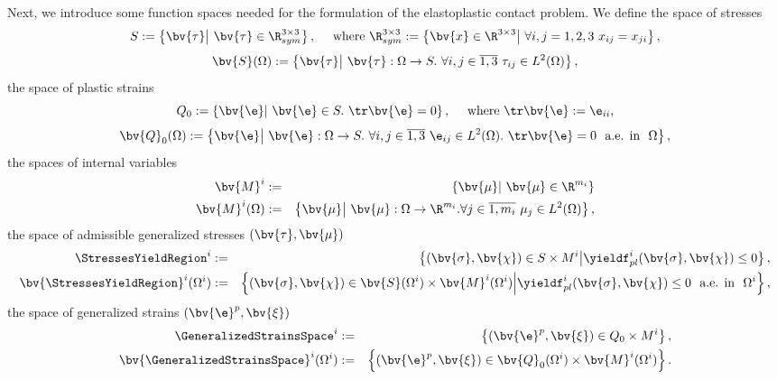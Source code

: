 Next, we introduce some function spaces needed for the formulation of the elastoplastic contact problem. We define the space of stresses
\begin{equation}
S:=\left\{\bv{\tau}\middle|~\bv{\tau}\in \R^{3\times 3}_{sym}\right\},\quad \mbox{ where } \R^{3\times 3}_{sym}:=\left\lbrace \bv{x}\in \R^{3\times 3}\middle|~ \forall i,j=1,2,3~x_{ij}=x_{ji}\right\rbrace,
\end{equation}
\begin{equation}
\bv{S}(\Omega):=\left\{\bv{\tau}\middle|~\bv{\tau}:\Omega\rightarrow S.~\forall i,j\in \overline{1,3}~ \tau_{ij}\in L^{2}(\Omega) \right\},
\end{equation}
the space of plastic strains
\begin{equation}
Q_0:=\left\{\bv{\e}\middle|~\bv{\e}\in S.~ \tr \bv{\e} = 0\right\},\quad \mbox{ where } \tr \bv{\e} :=\e_{ii},
\end{equation}
\begin{equation}
\bv{Q}_0(\Omega):=\left\{\bv{\e}\middle|~\bv{\e}:\Omega\rightarrow S.~\forall i,j\in \overline{1,3}~ \e_{ij}\in L^{2}(\Omega). ~ \tr \bv{\e} = 0~\text{ a.e. in }~\Omega \right\},
\end{equation}
the spaces of internal variables
\begin{eqnarray}
\bv{M}^{i}&:=&\left\{\bv{\mu}\middle|~\bv{\mu}\in \R^{m_i}\right\} \\
\bv{M}^{i}(\Omega)&:=&\left\{\bv{\mu}\middle|~\bv{\mu}:\Omega\rightarrow \R^{m_i}. \forall j \in \overline{1,m_i} ~ \mu_j\in L^{2}(\Omega) \right\},
\end{eqnarray}
the space of admissible generalized stresses $(\bv{\tau},\bv{\mu})$
\begin{eqnarray}
\StressesYieldRegion^{i}&:=&\left\lbrace (\bv{\sigma},\bv{\chi})\in S\times M^{i} \middle| \yieldf_{pl}^{i}(\bv{\sigma},\bv{\chi})\leq 0 \right\rbrace, \\
\bv{\StressesYieldRegion}^{i}(\Omega^{i})&:=&\left\lbrace (\bv{\sigma},\bv{\chi})\in \bv{S}(\Omega^i)\times \bv{M}^{i}(\Omega^i)\middle|\yieldf_{pl}^{i}(\bv{\sigma},\bv{\chi})\leq 0 ~\text{ a.e. in }~\Omega^i\right\rbrace,
\end{eqnarray}
the space of generalized strains $(\bv{\e}^{p},\bv{\xi})$
\begin{eqnarray}
\GeneralizedStrainsSpace^{i}&:=&\left\lbrace (\bv{\e}^{p},\bv{\xi})\in Q_0\times M^{i} \right\rbrace, \\
\bv{\GeneralizedStrainsSpace}^{i}(\Omega^{i})&:=&\left\lbrace (\bv{\e}^{p},\bv{\xi})\in \bv{Q}_0(\Omega^i)\times \bv{M}^{i}(\Omega^i)\right\rbrace.
\end{eqnarray}


